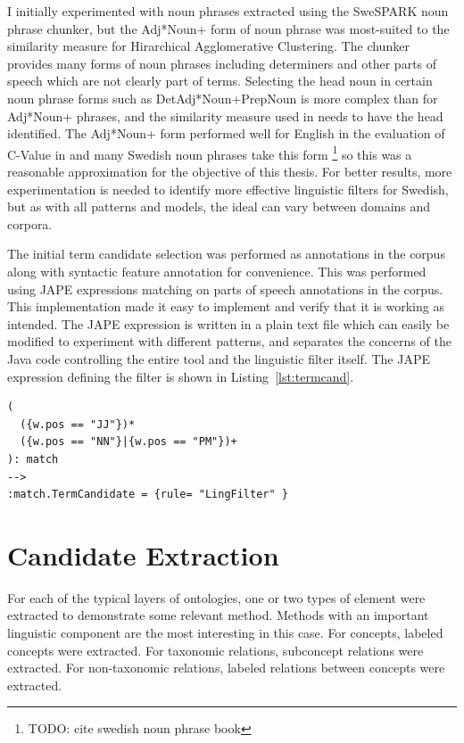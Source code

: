 \documentclass[a4paper]{report}
\newcommand{\todo}[1]{\footnote{{\color{red} TODO: #1}}}
\begin{document}
I initially experimented with noun phrases extracted using the SweSPARK noun phrase chunker, but the Adj*Noun+ form of noun phrase was most-suited to the similarity measure for Hirarchical Agglomerative Clustering.
The chunker provides many forms of noun phrases including determiners and other parts of speech which are not clearly part of terms.
Selecting the head noun in certain noun phrase forms such as DetAdj*Noun+PrepNoun is more complex than for Adj*Noun+ phrases, and the similarity measure used in \cite{Drymonas10OntoGain} needs to have the head identified.
The Adj*Noun+ form performed well for English in the evaluation of C-Value in \cite{Frantzi98CNCValue} and many Swedish noun phrases take this form \todo{cite swedish noun phrase book} so this was a reasonable approximation for the objective of this thesis.
For better results, more experimentation is needed to identify more effective linguistic filters for Swedish, but as with all patterns and models, the ideal can vary between domains and corpora.

The initial term candidate selection was performed as annotations in the corpus along with syntactic feature annotation for convenience.
This was performed using JAPE expressions matching on parts of speech annotations in the corpus.
This implementation made it easy to implement and verify that it is working as intended.
The JAPE expression is written in a plain text file which can easily be modified to experiment with different patterns, and separates the concerns of the Java code controlling the entire tool and the linguistic filter itself.
The JAPE expression defining the filter is shown in Listing~\ref{lst:termcand}.

\begin{Code}
\begin{lstlisting}[frame=single]
(
  ({w.pos == "JJ"})*
  ({w.pos == "NN"}|{w.pos == "PM"})+
): match
-->
:match.TermCandidate = {rule= "LingFilter" }
\end{lstlisting}
\end{Code}

\section{Candidate Extraction}
\label{sec:results:proto:cands}

For each of the typical layers of ontologies, one or two types of element were extracted to demonstrate some relevant method.
Methods with an important linguistic component are the most interesting in this case. 
For concepts, labeled concepts were extracted.
For taxonomic relations, subconcept relations were extracted.
For non-taxonomic relations, labeled relations between concepts were extracted.
\end{document}
